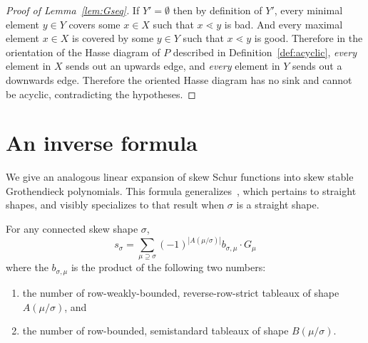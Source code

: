 \begin{proof}[Proof of Lemma~\ref{lem:Gseq}]
If $Y'=\emptyset$ then by definition of $Y'$, every minimal element $y\in Y$ covers some $x\in X$ such that $x\lessdot y$ is bad. And every maximal element $x\in X$ is covered by some $y \in Y$ such that $x\lessdot y$ is good. Therefore in the orientation of the Hasse diagram of $P$ described in Definition~\ref{def:acyclic}, \emph{every} element in $X$ sends out an upwards edge, and \emph{every} element in $Y$ sends out a downwards edge. Therefore the oriented Hasse diagram has no sink and cannot be acyclic, contradicting the hypotheses.
\end{proof}



\section{An inverse formula}



We give an analogous linear expansion of skew Schur functions into skew stable Grothendieck polynomials. This formula generalizes~\cite[Theorem~2.7]{lenart-combinatorial}, which pertains to straight shapes, and visibly specializes to that result when $\sigma$ is a straight shape. 

\begin{theorem}\label{t:back}
For any connected skew shape $\sigma$, 
\begin{equation}\label{eq:gsigma-conj}
s_\sigma = \sum_{\mu\supseteq \sigma} (-1)^{|A(\mu/\sigma)|} b_{\sigma,\mu} \cdot G_\mu
\end{equation}
where the $b_{\sigma, \mu}$ is the product of the following two numbers:
\begin{enumerate}
\item the number of row-weakly-bounded, reverse-row-strict tableaux of shape $A( \mu/\sigma)$, and 
\item the number of row-bounded, semistandard tableaux of shape $B(\mu/\sigma)$.
\end{enumerate}
\end{theorem}

